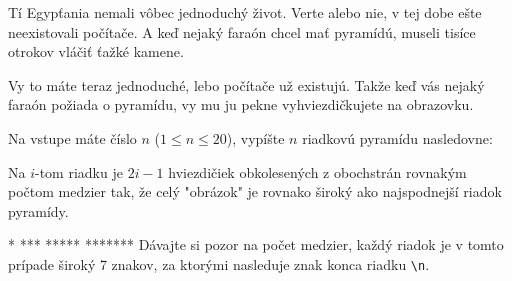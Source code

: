 




Tí Egypťania nemali vôbec jednoduchý život. Verte alebo nie, 
v tej dobe ešte neexistovali počítače. A keď nejaký faraón chcel mať pyramídú, 
museli tisíce otrokov vláčiť ťažké kamene.

Vy to máte teraz jednoduché, lebo počítače už existujú.
Takže keď vás nejaký faraón požiada o pyramídu, vy mu ju pekne vyhviezdičkujete na obrazovku.


Na vstupe máte číslo $n$ ($1\leq n\leq 20$), vypíšte $n$ riadkovú pyramídu nasledovne:

Na $i$-tom riadku je $2i-1$ hviezdičiek obkolesených z obochstrán rovnakým počtom medzier tak,
že celý "obrázok" je rovnako široký ako najspodnejší riadok pyramídy.



\vystup
   *    
  ***  
 ***** 
*******
\komentar
Dávajte si pozor na počet medzier, každý riadok je v tomto
prípade široký 7 znakov, za ktorými nasleduje znak konca riadku \verb'\n'.
\koniec


